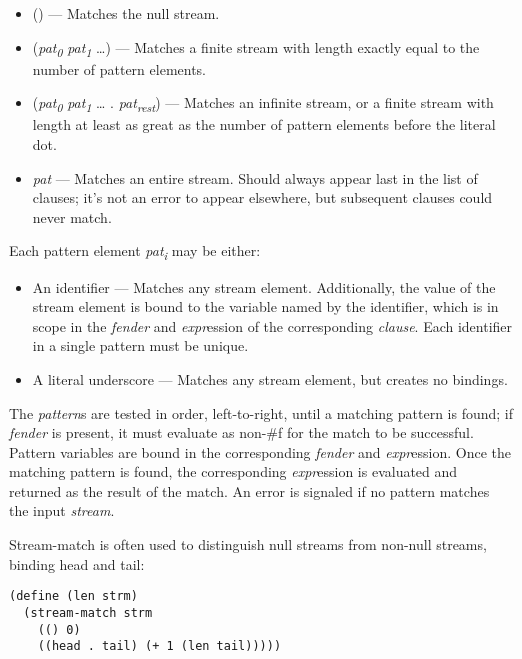 \begin{itemize}
\tightlist
\item
  () --- Matches the null stream.
\item
  (\emph{pat}\textsubscript{\emph{0}} \emph{pat}\textsubscript{\emph{1}}
  \ldots{}) --- Matches a finite stream with length exactly equal to the
  number of pattern elements.
\item
  (\emph{pat}\textsubscript{\emph{0}} \emph{pat}\textsubscript{\emph{1}}
  \ldots{} . \emph{pat}\textsubscript{\emph{rest}}) --- Matches an
  infinite stream, or a finite stream with length at least as great as
  the number of pattern elements before the literal dot.
\item
  \emph{pat} --- Matches an entire stream. Should always appear last in
  the list of clauses; it's not an error to appear elsewhere, but
  subsequent clauses could never match.
\end{itemize}

Each pattern element \emph{pat}\textsubscript{\emph{i}} may be either:

\begin{itemize}
\tightlist
\item
  An identifier --- Matches any stream element. Additionally, the value
  of the stream element is bound to the variable named by the
  identifier, which is in scope in the \emph{fender} and
  \emph{expr}ession of the corresponding \emph{clause}. Each identifier
  in a single pattern must be unique.
\item
  A literal underscore --- Matches any stream element, but creates no
  bindings.
\end{itemize}

The \emph{pattern}s are tested in order, left-to-right, until a matching
pattern is found; if \emph{fender} is present, it must evaluate as
non-\#f for the match to be successful. Pattern variables are bound in
the corresponding \emph{fender} and \emph{expr}ession. Once the matching
pattern is found, the corresponding \emph{expr}ession is evaluated and
returned as the result of the match. An error is signaled if no pattern
matches the input \emph{stream}.

Stream-match is often used to distinguish null streams from non-null
streams, binding head and tail:

\begin{verbatim}
(define (len strm)
  (stream-match strm
    (() 0)
    ((head . tail) (+ 1 (len tail)))))
\end{verbatim}

